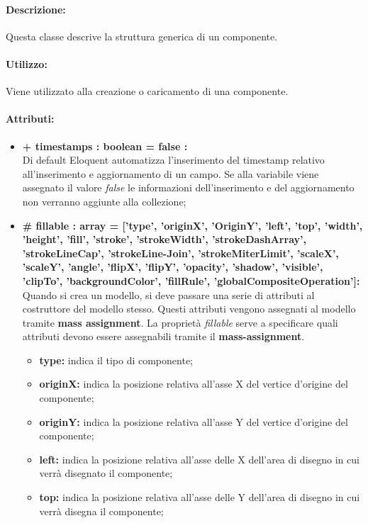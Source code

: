 	\paragraph{Descrizione:}
	Questa classe descrive la struttura generica di un componente.
	
	\paragraph{Utilizzo:}
	Viene utilizzato alla creazione o caricamento di una componente.
	
	\paragraph{Attributi:}
	\begin{itemize}
		\item \textbf{+ timestamps : boolean = false :}\\
		Di default Eloquent automatizza l'inserimento del timestamp relativo all'inserimento e aggiornamento di un campo. Se alla variabile viene assegnato il valore \textit{false} le informazioni dell'inserimento e del aggiornamento non verranno aggiunte alla collezione;
		\item \textbf{\# fillable : array = [’type’, ’originX’, ’OriginY’, ’left’, ’top’, ’width’, ’height’, ’fill’, ’stroke’, ’strokeWidth’, ’strokeDashArray’, ’strokeLineCap’, ’strokeLine-Join’, ’strokeMiterLimit’, ’scaleX’, ’scaleY’, ’angle’, ’flipX’, ’flipY’, ’opacity’, ’shadow’, ’visible’, ’clipTo’, ’backgroundColor’, ’fillRule’, ’globalCompositeOperation']:}\\
		Quando si crea un modello, si deve passare una serie di attributi al costruttore del modello stesso. Questi attributi vengono assegnati al modello tramite \textbf{mass assignment}. La proprietà \textit{fillable} serve a specificare quali attributi devono essere assegnabili tramite il \textbf{mass-assignment}.
		\begin{itemize}
			\item \textbf{type:} indica il tipo di componente;
			\item \textbf{originX:} indica la posizione relativa all'asse X del vertice d'origine del componente;
			\item \textbf{originY:} indica la posizione relativa all'asse Y del vertice d'origine del componente;
			\item \textbf{left:} indica la posizione relativa all'asse delle X dell'area di disegno in cui verrà disegnato il componente;
			\item \textbf{top:} indica la posizione relativa all'asse delle Y dell'area di disegno in cui verrà disegna il componente;

\end{itemize}
\end{itemize}
